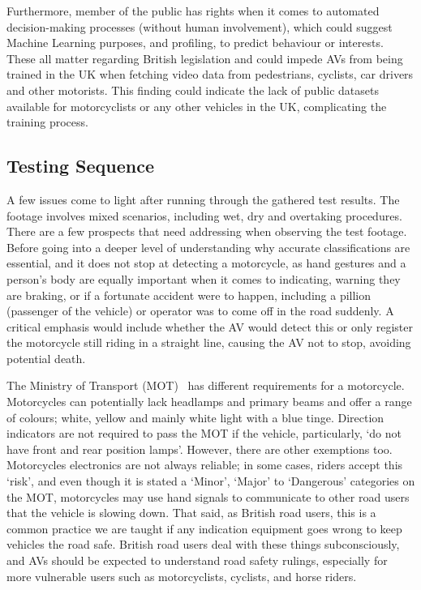 \documentclass[conference]{IEEEtran}
\begin{document}
		Furthermore, member of the public has rights when it comes to automated decision-making processes (without human involvement), which could suggest Machine Learning purposes, and profiling, to predict behaviour or interests. These all matter regarding British legislation and could impede AVs from being trained in the UK when fetching video data from pedestrians, cyclists, car drivers and other motorists. This finding could indicate the lack of public datasets available for motorcyclists or any other vehicles in the UK, complicating the training process.

	\subsection{Testing Sequence}
		A few issues come to light after running through the gathered test results. The footage involves mixed scenarios, including wet, dry and overtaking procedures. There are a few prospects that need addressing when observing the test footage. Before going into a deeper level of understanding why accurate classifications are essential, and it does not stop at detecting a motorcycle, as hand gestures and a person's body are equally important when it comes to indicating, warning they are braking, or if a fortunate accident were to happen, including a pillion (passenger of the vehicle) or operator was to come off in the road suddenly. A critical emphasis would include whether the AV would detect this or only register the motorcycle still riding in a straight line, causing the AV not to stop, avoiding potential death. 
			
		The Ministry of Transport (MOT)~\cite{govuk_mot_nodate} has different requirements for a motorcycle. Motorcycles can potentially lack headlamps and primary beams and offer a range of colours; white, yellow and mainly white light with a blue tinge. Direction indicators are not required to pass the MOT if the vehicle, particularly, `do not have front and rear position lamps'. However, there are other exemptions too. Motorcycles electronics are not always reliable; in some cases, riders accept this `risk', and even though it is stated a `Minor', `Major' to `Dangerous' categories on the MOT, motorcycles may use hand signals to communicate to other road users that the vehicle is slowing down. That said, as British road users, this is a common practice we are taught if any indication equipment goes wrong to keep vehicles the road safe. British road users deal with these things subconsciously, and AVs should be expected to understand road safety rulings, especially for more vulnerable users such as motorcyclists, cyclists, and horse riders.
		
\end{document}
